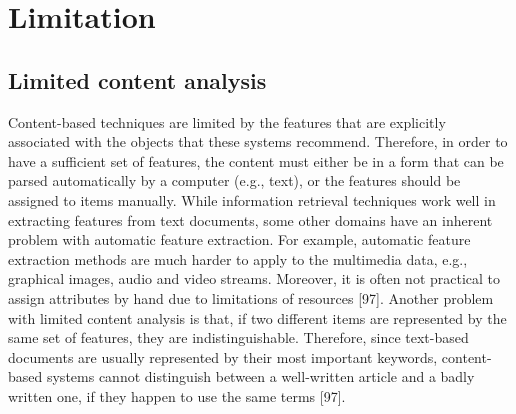 \section{Limitation}
\subsection{Limited content analysis}
Content-based techniques are limited by the features that are explicitly associated with the objects that these systems recommend. Therefore, in order to have a sufficient set of features, the content must either be in a form that can be parsed automatically by a computer (e.g., text), or the features should be assigned to items manually. While information retrieval techniques work well in extracting features from text documents, some other domains have an inherent problem with automatic feature extraction. For example, automatic feature extraction methods are much harder to apply to the multimedia data, e.g., graphical images, audio and video streams. Moreover, it is often not practical to assign attributes by hand due to limitations of resources [97].
Another problem with limited content analysis is that, if two different items are represented by the same set of features, they are indistinguishable. Therefore, since text-based documents are usually represented by their most important keywords, content-based systems cannot distinguish between a well-written article and a badly written one, if they happen to use the same terms [97].

